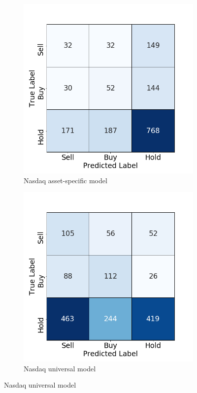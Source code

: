 \documentclass[12pt, a4paper]{article}
\begin{document}
\begin{figure}[H]
\begin{subfigure}{.5\textwidth}
  \centering
  \includegraphics[width=.75\linewidth]{images/CMs/CM_indiv_IXIC.png}  
  \caption{Nasdaq asset-specific model}
  \label{fig:subIXICI}
\end{subfigure}
\begin{subfigure}{.5\textwidth}
  \centering
  \includegraphics[width=.75\linewidth]{images/CMs/CM_univ_IXIC.png}  
  \caption{Nasdaq universal model}
  \label{fig:subIXICU}
\end{subfigure}


\end{figure}
\end{document}
